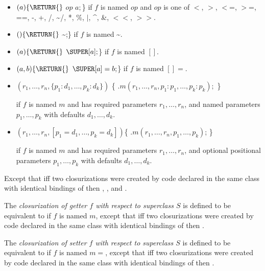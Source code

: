 \documentclass{article}
\newcommand{\code}[1]{{\sf #1}}
\begin{document}
\LMHash{}
\begin{itemize}
\item $(a) \{\RETURN{}$ \SUPER{} $op$ $a;$\} if $f$ is named $op$ and $op$ is one of  \code{$<$, $>$, $<$=, $>$=, ==,  -, +, /, \~{}/, *, \%, $|$, \^{}, \&, $<<$, $>>$}.
\item $() \{\RETURN{}$ \~{}\SUPER;\} if $f$ is named \~{}.
\item $(a) \{\RETURN{}$ $\SUPER[a];$\} if $f$ is named $[]$.
\item $(a, b) \{\RETURN{}$ $\SUPER[a] = b;$\} if $f$ is named $[]=$.
\item  
\begin{dartCode}
$(r_1, \ldots, r_n, \{p_1 : d_1, \ldots , p_k : d_k\})$ \{
  \RETURN{} \SUPER$.m(r_1, \ldots, r_n, p_1: p_1, \ldots, p_k: p_k);$
\} 
\end{dartCode}
if $f$ is named $m$ and has required parameters $r_1, \ldots, r_n$, and named parameters $p_1, \ldots, p_k$ with defaults $d_1, \ldots, d_k$.
\item 
\begin{dartCode}
$(r_1, \ldots, r_n, [p_1 = d_1, \ldots , p_k = d_k])$\{
  \RETURN{} \SUPER$.m(r_1, \ldots, r_n, p_1, \ldots, p_k)$;
\}
\end{dartCode}

if $f$ is named $m$ and has required parameters $r_1, \ldots, r_n$, and optional positional parameters $p_1, \ldots, p_k$ with defaults $d_1, \ldots, d_k$.
\end{itemize}

\LMHash{}
Except that iff two closurizations were created by code declared in the same class with identical bindings of \THIS{} then  ,  ,  and  .


\LMHash{}
The {\em closurization of getter $f$  with respect to superclass $S$} is defined to be equivalent to  if $f$ is named $m$, except that iff two closurizations were created by code declared in the same class with identical bindings of \THIS{} then  .

\LMHash{}
The {\em closurization of setter $f$  with respect to superclass $S$} is defined to be equivalent to  if $f$ is named $m=$, except that iff two closurizations were created by code declared in the same class with identical bindings of \THIS{} then .
\end{document}

